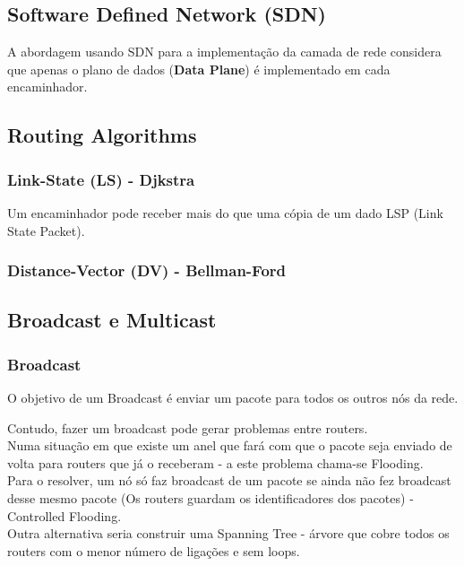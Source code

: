 \documentclass[12pt]{article}
\begin{document}
\subsection{Software Defined Network (SDN)}

A abordagem usando SDN para a implementação da camada de rede considera que apenas o plano de dados (\textbf{Data Plane}) é implementado em cada encaminhador.

\subsection{Routing Algorithms}

\subsubsection{Link-State (LS) - Djkstra}

Um encaminhador pode receber mais do que uma cópia de um dado LSP (Link State Packet).

\subsubsection{Distance-Vector (DV) - Bellman-Ford}

\subsection{Broadcast e Multicast}

\subsubsection*{Broadcast}

O objetivo de um Broadcast é enviar um pacote para todos os outros nós da rede.

Contudo, fazer um broadcast pode gerar problemas entre routers. \\

Numa situação em que existe um anel que fará com que o pacote seja enviado de volta para routers que já o receberam - a este problema chama-se Flooding. \\

Para o resolver, um nó só faz broadcast de um pacote se ainda não fez broadcast desse mesmo pacote (Os routers guardam os identificadores dos pacotes) - Controlled Flooding. \\

Outra alternativa seria construir uma Spanning Tree - árvore que cobre todos os routers com o menor número de ligações e sem loops.
\end{document}

